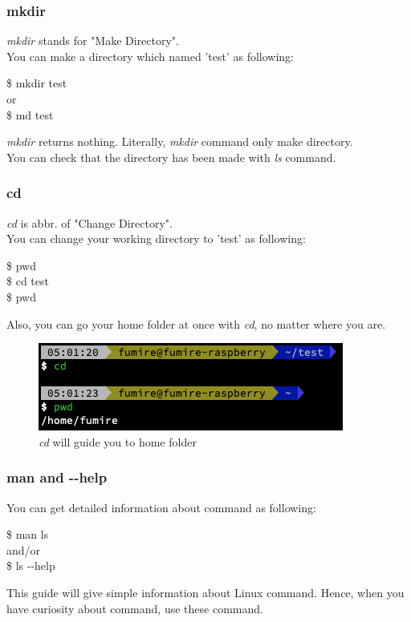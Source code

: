 \documentclass{beamer}
\begin{document}
	\begin{frame}
		\frametitle{mkdir}
		\textit{mkdir} stands for "Make Directory". \\
		You can make a directory which named 'test' as following: 
		\begin{example}
			\$ mkdir test \\
			or \\
			\$ md test \\
		\end{example}
		\textit{mkdir} returns nothing. Literally, \textit{mkdir} command only make directory. \\
		You can check that the directory has been made with \textit{ls} command. 
	\end{frame}

	\begin{frame}
		\frametitle{cd}
		\textit{cd} is abbr. of "Change Directory". \\
		You can change your working directory to 'test' as following:
		\begin{example}
			\$ pwd \\
			\$ cd test\\
			\$ pwd \\
		\end{example}
	
		Also, you can go your home folder at once with \textit{cd}, no matter where you are.
		\begin{figure}[h!]
			\centering
			\includegraphics[width=0.7 \linewidth]{figures/6.png}
			\caption{\textit{cd} will guide you to home folder}
		\end{figure}
	\end{frame}

	\begin{frame}
		\frametitle{man and -$ $-help}
		You can get detailed information about command as following:
		\begin{example}
			\$ man ls \\
			and/or \\
			\$ ls -$ $-help
		\end{example}
		This guide will give simple information about Linux command. Hence, when you have curiosity about command, use these command.
	\end{frame}
\end{document}
